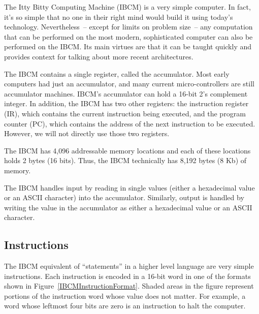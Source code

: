 The Itty Bitty Computing Machine (IBCM) is a very simple computer.  In
fact, it's so simple that no one in their right mind would build it
using today's technology. Nevertheless~-- except for limits on problem
size~-- any computation that can be performed on the most modern,
sophisticated computer can also be performed on the IBCM.  Its main
virtues are that it can be taught quickly and provides context for
talking about more recent architectures.

The IBCM contains a single register, called the accumulator.  Most
early computers had just an accumulator, and many current
micro-controllers are still accumulator machines.  IBCM's accumulator
can hold a 16-bit 2's complement integer.  In addition, the IBCM has
two other registers: the instruction register (IR), which contains the
current instruction being executed, and the program counter (PC),
which contains the address of the next instruction to be executed.
However, we will not directly use those two registers.

The IBCM has 4,096 addressable memory locations and each of these
locations holds 2 bytes (16 bits).  Thus, the IBCM technically has
8,192 bytes (8 Kb) of memory.

The IBCM handles input by reading in single values (either a
hexadecimal value or an ASCII character) into the accumulator.
Similarly, output is handled by writing the value in the accumulator
as either a hexadecimal value or an ASCII character.

\subsection{Instructions}

The IBCM equivalent of ``statements'' in a higher level language are
very simple instructions.  Each instruction is encoded in a 16-bit
word in one of the formats shown in
Figure~\ref{IBCMInstructionFormat}.  Shaded areas in the figure
represent portions of the instruction word whose value does not
matter. For example, a word whose leftmost four bits are zero is an
instruction to halt the computer.


